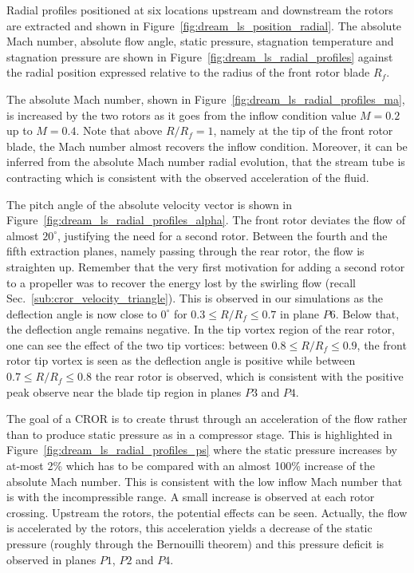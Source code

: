 Radial profiles positioned at six locations upstream and downstream the rotors
are extracted and shown in Figure~\ref{fig:dream_ls_position_radial}.
The absolute
Mach number, absolute flow angle, static pressure, 
stagnation temperature and stagnation pressure
are shown in Figure~\ref{fig:dream_ls_radial_profiles}
against the radial position expressed
relative to the radius of the front rotor blade $R_f$.

The absolute Mach number, shown in 
Figure~\ref{fig:dream_ls_radial_profiles_ma}, is increased by
the two rotors as it goes from the inflow condition value $M=0.2$
up to $M=0.4$. Note that above $R/R_f=1$, namely at the tip
of the front rotor blade, the Mach number
almost recovers the inflow condition. Moreover, it can be inferred from the
absolute Mach number radial evolution, that the stream tube is contracting which is consistent
with the observed acceleration of the fluid.

The pitch angle of the absolute velocity vector is shown in 
Figure~\ref{fig:dream_ls_radial_profiles_alpha}. The front rotor
deviates the flow of almost $20^\circ$, justifying the need
for a second rotor. Between the fourth and the fifth extraction planes, namely
passing through the rear rotor, the flow is straighten up. Remember that 
the very first motivation for adding a second rotor to a propeller
was to recover the energy lost by the swirling flow
(recall Sec.~\ref{sub:cror_velocity_triangle}). This is observed in our simulations as
the deflection angle is now close to $0^\circ$ for $0.3 \leq R/R_f \leq 0.7$
in plane $P6$.
Below that, the deflection angle remains negative. In the tip vortex region
of the rear rotor, one can see the effect of the two tip vortices: between 
$0.8 \leq R/R_f \leq 0.9$, the front rotor tip vortex is seen as the 
deflection angle is positive while between $0.7 \leq R/R_f \leq 0.8$
the rear rotor is observed, 
which is consistent with the positive
peak observe near the blade tip region in planes $P3$ and $P4$.

The goal of a CROR is to create thrust through an acceleration of 
the flow rather than to produce static pressure as in a compressor stage.
This is highlighted in Figure~\ref{fig:dream_ls_radial_profiles_ps}
where the static pressure increases by at-most 2\% which has to 
be compared with an almost 100\% increase of the absolute
Mach number. This is consistent with the low inflow Mach number
that is with the incompressible range.
A small increase is observed at each
rotor crossing. Upstream the rotors, the potential effects can
be seen. Actually, the flow is accelerated by the rotors, this acceleration
yields a decrease of the static pressure 
(roughly through the Bernouilli theorem) and this pressure deficit is observed in
planes $P1$, $P2$ and $P4$.

